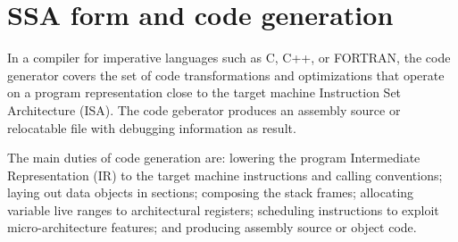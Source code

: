 \chapter{SSA form and code generation }
\label{chapter:ssa-codegen}

In a compiler for imperative languages such as C, C++, or FORTRAN, the code
generator covers the set of code transformations and optimizations that operate
on a program representation close to the target machine Instruction Set
Architecture (ISA). The code geberator produces an
assembly source or relocatable file with debugging information as result.

The main duties of code generation are: lowering the program Intermediate
Representation (IR) \cite{Stanier:2013:CS} to the target machine instructions and calling conventions;
laying out data objects in sections; composing the stack frames; allocating
variable live ranges to architectural registers; scheduling instructions to
exploit micro-architecture features; and producing assembly source or object code.


